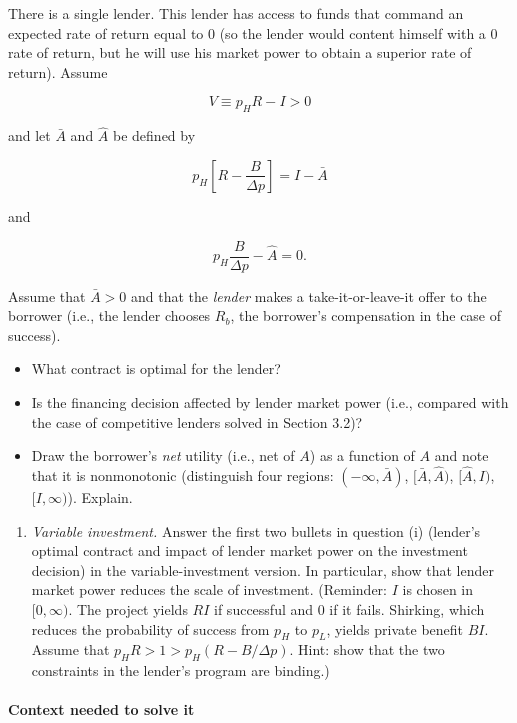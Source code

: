 \documentclass[11pt,a4paper]{article}
\providecommand{\tightlist}{\setlength{\itemsep}{0pt}\setlength{\parskip}{0pt}}
\begin{document}
There is a single lender. This lender has access to funds that command an expected rate of return
equal to 0 (so the lender would content himself with a 0 rate of return, but he will use his market
power to obtain a superior rate of return). Assume

\[V \equiv p_H R - I > 0\]

and let \(\bar A\) and \(\hat A\) be defined by

\[p_H\left[R - \frac{B}{\Delta p}\right] = I - \bar A\]

and

\[p_H \frac{B}{\Delta p} - \hat A = 0.\]

Assume that \(\bar A > 0\) and that the \emph{lender} makes a take-it-or-leave-it offer to the
borrower (i.e., the lender chooses \(R_b\), the borrower's compensation in the case of success).

\begin{itemize}
\tightlist
\item
  What contract is optimal for the lender?
\item
  Is the financing decision affected by lender market power (i.e., compared with the case of
  competitive lenders solved in Section 3.2)?
\item
  Draw the borrower's \emph{net} utility (i.e., net of \(A\)) as a function of \(A\) and note that
  it is nonmonotonic (distinguish four regions: \((-\infty, \bar A)\), \([\bar A, \hat A)\),
  \([\hat A, I)\), \([I, \infty)\)). Explain.
\end{itemize}

\begin{enumerate}
\def\labelenumi{(\roman{enumi})}
\setcounter{enumi}{1}
\tightlist
\item
  \emph{Variable investment.} Answer the first two bullets in question (i) (lender's optimal
  contract and impact of lender market power on the investment decision) in the variable-investment
  version. In particular, show that lender market power reduces the scale of investment. (Reminder:
  \(I\) is chosen in \([0, \infty)\). The project yields \(RI\) if successful and 0 if it fails.
  Shirking, which reduces the probability of success from \(p_H\) to \(p_L\), yields private benefit
  \(BI\). Assume that \(p_H R > 1 > p_H(R - B/\Delta p)\). Hint: show that the two constraints in
  the lender's program are binding.)
\end{enumerate}

\paragraph{Context needed to solve it}
\end{document}
